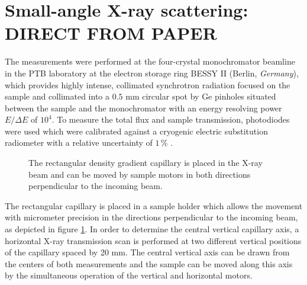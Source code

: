 \section{Small-angle X-ray scattering: DIRECT FROM PAPER}
The measurements were performed at the four-crystal monochromator beamline in the PTB laboratory at the electron storage ring BESSY II (Berlin, \emph{Germany}), which provides highly intense, collimated synchrotron radiation focused on the sample and collimated into a \(0.5\) mm circular spot by Ge pinholes situated between the sample and the monochromator with an energy resolving power \( E/\Delta E \) of \( 10^4 \). To measure the total flux and sample transmission, photodiodes were used which were calibrated against a cryogenic electric substitution radiometer with a relative uncertainty of \( 1\,\% \) \cite{krumrey_high-accuracy_2001}.


\begin{figure}%
	\centering
		
		\caption{The rectangular density gradient capillary is placed in the X-ray beam and can be moved by sample motors in both directions perpendicular to the incoming beam.}
		\label{fig:DensityGradientCapillarySetup}
\end{figure}

The rectangular capillary is placed in a sample holder which allows the movement with micrometer precision in the directions perpendicular to the incoming beam, as depicted in figure \ref{fig:DensityGradientCapillarySetup}. In order to determine the central vertical capillary axis, a horizontal X-ray transmission scan is performed at two different vertical positions of the capillary spaced by 20 mm. The central vertical axis can be drawn from the centers of both measurements and the sample can be moved along this axis by the simultaneous operation of the vertical and horizontal motors.

